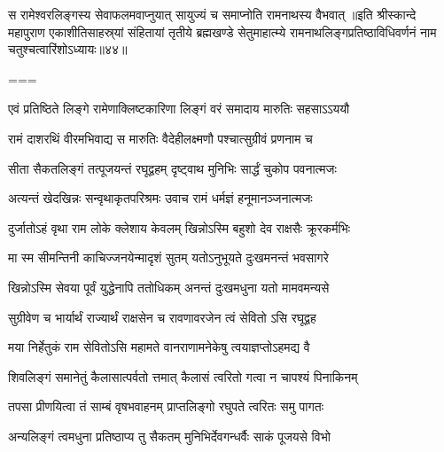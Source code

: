 \twolineshloka
{स रामेश्वरलिङ्गस्य सेवाफलमवाप्नुयात्}
{सायुज्यं च समाप्नोति रामनाथस्य वैभवात्}%
॥इति श्रीस्कान्दे महापुराण एकाशीतिसाहस्र्यां संहितायां तृतीये ब्रह्मखण्डे सेतुमाहात्म्ये रामनाथलिङ्गप्रतिष्ठाविधिवर्णनं नाम चतुश्चत्वारिंशोऽध्यायः॥४४॥

===


\vakta{}
\shrota{}
\tags{}
\notes{}

\storymeta





\twolineshloka
{एवं प्रतिष्ठिते लिङ्गे रामेणाक्लिष्टकारिणा}
{लिङ्गं वरं समादाय मारुतिः सहसाऽऽययौ}%

\twolineshloka
{रामं दाशरथिं वीरमभिवाद्य स मारुतिः}
{वैदेहीलक्ष्मणौ पश्चात्सुग्रीवं प्रणनाम च}%

\twolineshloka
{सीता सैकतलिङ्गं तत्पूजयन्तं रघूद्वहम्}
{दृष्ट्वाथ मुनिभिः सार्द्धं चुकोप पवनात्मजः}%

\twolineshloka
{अत्यन्तं खेदखिन्नः सन्वृथाकृतपरिश्रमः}
{उवाच रामं धर्मज्ञं हनूमानञ्जनात्मजः}%


\twolineshloka
{दुर्जातोऽहं वृथा राम लोके क्लेशाय केवलम्}
{खिन्नोऽस्मि बहुशो देव राक्षसैः क्रूरकर्मभिः}%

\twolineshloka
{मा स्म सीमन्तिनी काचिज्जनयेन्मादृशं सुतम्}
{यतोऽनुभूयते दुःखमनन्तं भवसागरे}%

\twolineshloka
{खिन्नोऽस्मि सेवया पूर्वं युद्धेनापि ततोधिकम्}
{अनन्तं दुःखमधुना यतो मामवमन्यसे}%

\twolineshloka
{सुग्रीवेण च भार्यार्थं राज्यार्थं राक्षसेन च}
{रावणावरजेन त्वं सेवितो ऽसि रघूद्वह}%

\twolineshloka
{मया निर्हेतुकं राम सेवितोऽसि महामते}
{वानराणामनेकेषु त्वयाज्ञप्तोऽहमद्य वै}%

\twolineshloka
{शिवलिङ्गं समानेतुं कैलासात्पर्वतो त्तमात्}
{कैलासं त्वरितो गत्वा न चापश्यं पिनाकिनम्}%

\twolineshloka
{तपसा प्रीणयित्वा तं साम्बं वृषभवाहनम्}
{प्राप्तलिङ्गो रघुपते त्वरितः समु पागतः}%

\twolineshloka
{अन्यलिङ्गं त्वमधुना प्रतिष्ठाप्य तु सैकतम्}
{मुनिभिर्देवगन्धर्वैः साकं पूजयसे विभो}%


